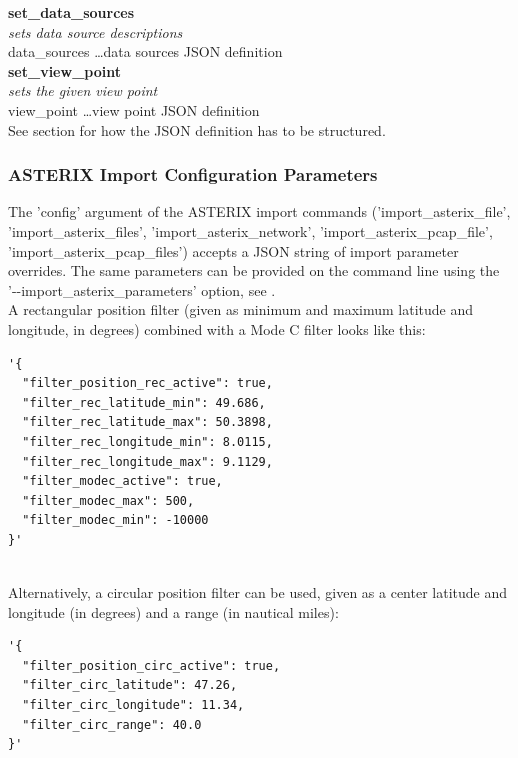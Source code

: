 \textbf{set\_data\_sources} \\
\textit{sets data source descriptions} \\
data\_sources \dots data sources JSON definition \\

\textbf{set\_view\_point} \\
\textit{sets the given view point} \\
view\_point \dots view point JSON definition \\
See section  for how the JSON definition has to be structured. \\

\subsubsection{ASTERIX Import Configuration Parameters}
\label{sec:rtcommand_asterix_import_config}

The 'config' argument of the ASTERIX import commands ('import\_asterix\_file', 'import\_asterix\_files', 'import\_asterix\_network', 'import\_asterix\_pcap\_file', 'import\_asterix\_pcap\_files') accepts a JSON string of import parameter overrides. The same parameters can be provided on the command line using the '-{}-import\_asterix\_parameters' option, see . \\

A rectangular position filter (given as minimum and maximum latitude and longitude, in degrees) combined with a Mode C filter looks like this:
\begin{lstlisting}[basicstyle=\small\ttfamily]
'{
  "filter_position_rec_active": true,
  "filter_rec_latitude_min": 49.686,
  "filter_rec_latitude_max": 50.3898,
  "filter_rec_longitude_min": 8.0115, 
  "filter_rec_longitude_max": 9.1129,
  "filter_modec_active": true,
  "filter_modec_max": 500,
  "filter_modec_min": -10000
}'
\end{lstlisting}
\ \\

Alternatively, a circular position filter can be used, given as a center latitude and longitude (in degrees) and a range (in nautical miles):
\begin{lstlisting}[basicstyle=\small\ttfamily]
'{
  "filter_position_circ_active": true,
  "filter_circ_latitude": 47.26,
  "filter_circ_longitude": 11.34,
  "filter_circ_range": 40.0
}'
\end{lstlisting}
\ \\

